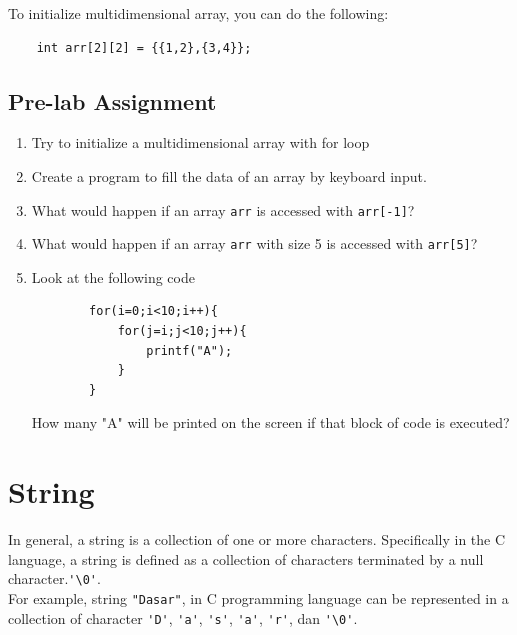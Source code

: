 To initialize multidimensional array, you can do the following:
\begin{verbatim}
    int arr[2][2] = {{1,2},{3,4}};
\end{verbatim}

\subsection{Pre-lab Assignment}
\begin{enumerate}
    \item Try to initialize a multidimensional array with for loop
    \item Create a program to fill the data of an array by keyboard input.
    \item What would happen if an array \verb|arr| is accessed with \verb|arr[-1]|?
    \item What would happen if an array \verb|arr| with size 5 is accessed with \verb|arr[5]|?
	\item Look at the following code
    \begin{verbatim}
        for(i=0;i<10;i++){
            for(j=i;j<10;j++){
                printf("A");
            }
        }
    \end{verbatim}
    How many "A" will be printed on the screen if that block of code is executed?
\end{enumerate}

\section{String}

In general, a string is a collection of one or more characters. Specifically in the C language, a string is defined as a collection of characters terminated by a null character.\verb|'\0'|.
\\
For example, string \verb|"Dasar"|, in C programming language can be represented in a collection of character \verb|'D'|, \verb|'a'|, \verb|'s'|, \verb|'a'|, \verb|'r'|, dan \verb|'\0'|.

